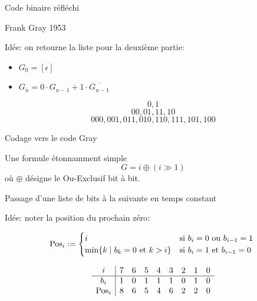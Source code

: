 \documentclass{beamer}
\begin{document}
\begin{frame}{Code binaire réfléchi}

  Frank Gray 1953
  \bigskip

  \begin{DEFN}
    Idée: on retourne la liste pour la deuxième partie:
    \begin{itemize}
    \item $G_0= [\epsilon]$
    \item $G_n= 0\cdot G_{n-1} + 1\cdot \overline{G_{n-1}}$
    \end{itemize}
  \end{DEFN}
  \[0, 1\]
  \[00, 01, 11, 10\]
  \[000, 001, 011, 010, 110, 111, 101, 100\]
\end{frame}

\begin{frame}{Codage vers le code Gray}

  \begin{NOTE}
    Une formule étonnamment simple
    \[G = i \oplus (i \gg 1)\]
    où $\oplus$ désigne le Ou-Exclusif bit à bit. 
  \end{NOTE}
\end{frame}


\begin{frame}{Passage d'une liste de bits à la suivante en temps constant}

Idée: noter la position du prochain zéro:
\begin{NOTE}
  \[ \operatorname{Pos}_i :=
  \begin{cases}
    i & \text{si $b_i=0$ ou $b_{i-1}=1$ } \\
    \min\{k \mid b_k = 0 \text{ et } k > i\} & \text{si $b_i=1$ et $b_{i-1}=0$ } \\
  \end{cases}
  \]
\end{NOTE}
\[\begin{array}{c|cccccccc}
i      &  7 & 6 & 5 & 4 & 3 & 2 & 1 & 0 \\\hline
b_i    &  1 & 0 & 1 & 1 & 1 & 0 & 1 & 0 \\
\operatorname{Pos}_i &  8 & 6 & 5 & 4 & 6 & 2 & 2 & 0 \\
\end{array}\]
\end{frame}
\end{document}
